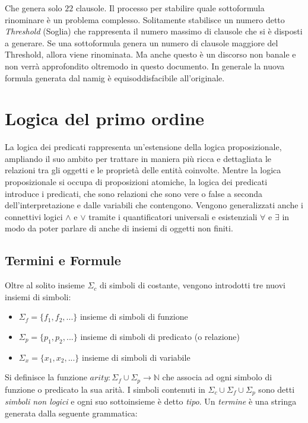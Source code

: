 \documentclass[./main.tex]{subfiles}
\begin{document}
Che genera solo $22$ clausole.
Il processo per stabilire quale sottoformula rinominare è un problema complesso. 
Solitamente stabilisce un numero detto \textit{Threshold} (Soglia) che rappresenta il numero massimo di clausole che si è disposti a generare.
Se una sottoformula genera un numero di clausole maggiore del Threshold, allora viene rinominata. 
Ma anche questo è un discorso non banale e non verrà approfondito oltremodo in questo documento.
In generale la nuova formula generata dal namig è equisoddisfacibile all'originale.


\section{Logica del primo ordine}

La logica dei predicati rappresenta un'estensione della logica proposizionale, 
ampliando il suo ambito per trattare in maniera più ricca e dettagliata le relazioni tra gli oggetti 
e le proprietà delle entità coinvolte. Mentre la logica proposizionale si occupa di proposizioni atomiche, 
la logica dei predicati introduce i predicati,
che sono relazioni che sono vere o false a seconda dell'interpretazione e dalle variabili che contengono.
Vengono generalizzati anche i connettivi logici $\land$ e $\lor$ tramite i quantificatori universali e esistenziali $\forall$ e $\exists$
in modo da poter parlare di anche di insiemi di oggetti non finiti.


\subsection{Termini e Formule} \label{sec:sintassi_fof}
Oltre al solito insieme $\Sigma_c$ di simboli di costante, vengono introdotti tre nuovi insiemi di simboli:
\begin{itemize}
  \item $\Sigma_f = \{f_1, f_2, ...\}$ insieme di simboli di funzione
  \item $\Sigma_p = \{p_1, p_2, ...\}$ insieme di simboli di predicato (o relazione)
  \item $\Sigma_x = \{x_1, x_2, ...\}$ insieme di simboli di variabile
\end{itemize}

Si definisce la funzione $arity : \Sigma_f \cup \Sigma_p \rightarrow \mathbb{N}$ che associa ad ogni simbolo di funzione o predicato la sua arità.
I simboli contenuti in $\Sigma_c \cup \Sigma_f \cup \Sigma_p$ sono detti \textit{simboli non logici} e ogni suo sottoinsieme è detto \textit{tipo}.
Un \textit{termine} è una stringa generata dalla seguente grammatica:
\end{document}
